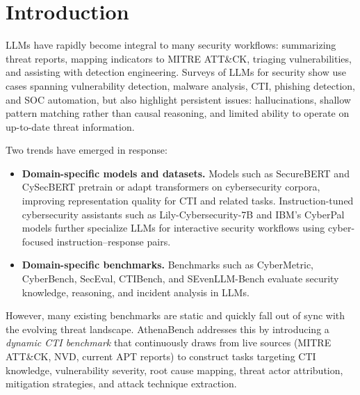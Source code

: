 \documentclass[sigconf]{acmart}
\begin{document}


\maketitle

\section{Introduction}

LLMs have rapidly become integral to many security workflows: summarizing threat reports, mapping indicators to MITRE ATT\&CK, triaging vulnerabilities, and assisting with detection engineering. Surveys of LLMs for security show use cases spanning vulnerability detection, malware analysis, CTI, phishing detection, and SOC automation, but also highlight persistent issues: hallucinations, shallow pattern matching rather than causal reasoning, and limited ability to operate on up-to-date threat information.\cite{levi2024cyberpal,liu2024cyberbench}

Two trends have emerged in response:

\begin{itemize}
  \item \textbf{Domain-specific models and datasets.} Models such as SecureBERT and CySecBERT pretrain or adapt transformers on cybersecurity corpora, improving representation quality for CTI and related tasks. Instruction-tuned cybersecurity assistants such as Lily-Cybersecurity-7B and IBM's CyberPal models further specialize LLMs for interactive security workflows using cyber-focused instruction--response pairs.\cite{levi2024cyberpal}
  \item \textbf{Domain-specific benchmarks.} Benchmarks such as CyberMetric, CyberBench, SecEval, CTIBench, and SEvenLLM-Bench evaluate security knowledge, reasoning, and incident analysis in LLMs.\cite{alam2024ctibench,ji2024sevenllm,liu2024cyberbench}
\end{itemize}

However, many existing benchmarks are static and quickly fall out of sync with the evolving threat landscape. AthenaBench addresses this by introducing a \emph{dynamic CTI benchmark} that continuously draws from live sources (MITRE ATT\&CK, NVD, current APT reports) to construct tasks targeting CTI knowledge, vulnerability severity, root cause mapping, threat actor attribution, mitigation strategies, and attack technique extraction.\cite{alam2025athenabench}
\end{document}
